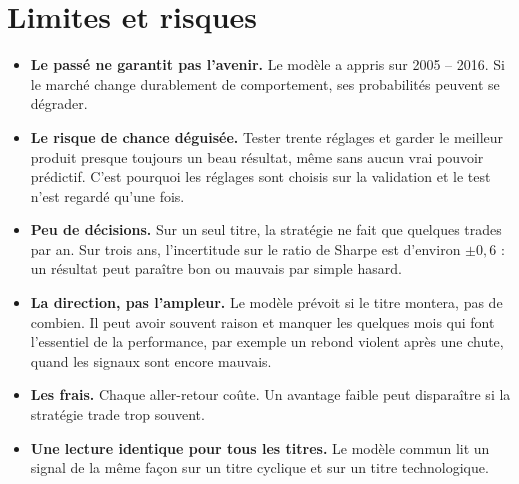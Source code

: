 \documentclass[11pt,a4paper]{article}
\begin{document}
\section{Limites et risques}
\begin{itemize}
  \item \textbf{Le passé ne garantit pas l'avenir.} Le modèle a appris sur 2005 -- 2016. Si
  le marché change durablement de comportement, ses probabilités peuvent se dégrader.
  \item \textbf{Le risque de chance déguisée.} Tester trente réglages et garder le meilleur
  produit presque toujours un beau résultat, même sans aucun vrai pouvoir prédictif. C'est
  pourquoi les réglages sont choisis sur la validation et le test n'est regardé qu'une fois.
  \item \textbf{Peu de décisions.} Sur un seul titre, la stratégie ne fait que quelques trades
  par an. Sur trois ans, l'incertitude sur le ratio de Sharpe est d'environ $\pm 0{,}6$ : un
  résultat peut paraître bon ou mauvais par simple hasard.
  \item \textbf{La direction, pas l'ampleur.} Le modèle prévoit si le titre montera, pas de
  combien. Il peut avoir souvent raison et manquer les quelques mois qui font l'essentiel
  de la performance, par exemple un rebond violent après une chute, quand les signaux sont
  encore mauvais.
  \item \textbf{Les frais.} Chaque aller-retour coûte. Un avantage faible peut disparaître
  si la stratégie trade trop souvent.
  \item \textbf{Une lecture identique pour tous les titres.} Le modèle commun lit un signal
  de la même façon sur un titre cyclique et sur un titre technologique.
\end{itemize}

\end{document}
